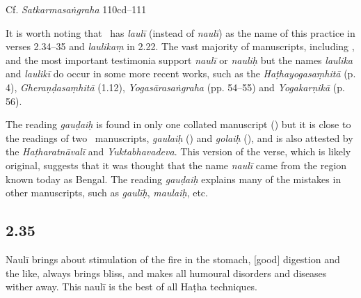\begin{ekdosis}
\begin{testimonia}[hp02_034]
Cf. \emph{Satkarmasaṅgraha} 110cd–111

\begin{versinnote}
\end{versinnote}

\end{testimonia}

\begin{philcomm}[hp02_034]
It is worth noting that \alphaOne\ has \emph{laulī} (instead of \emph{naulī}) as the name of this practice in verses 2.34–35 and \emph{laulikaṃ} in 2.22. The vast majority of manuscripts, including \alphaTwo, and the most important testimonia support \emph{naulī} or \emph{nauliḥ} but the names \emph{laulika} and \emph{laulikī} do occur in some more recent works, such as the \emph{Haṭhayogasaṃhitā} (p. 4), \emph{Gheraṇḍasaṃhitā} (1.12), \emph{Yogasārasaṅgraha} (pp. 54–55) and \emph{Yogakarṇikā} (p. 56). 


The reading \emph{gauḍaiḥ} is found in only one collated manuscript (\etaTwo) but it is close to the readings of two \textalpha\ manuscripts, \emph{gaulaiḥ} (\alphaOne) and \emph{golaiḥ} (\alphaThree), and is also attested by the \emph{Haṭharatnāvalī} and \emph{Yuktabhavadeva}. This version of the verse, which is likely original, suggests that it was thought that the name \emph{naulī} came from the region known today as Bengal. The reading \emph{gauḍaiḥ} explains many of the mistakes in other manuscripts, such as \emph{gaulīḥ}, \emph{maulaiḥ}, etc.
\end{philcomm}

\subsection*{2.35}
\begin{translation}[hp02_035]
Naulī brings about stimulation of the fire in the stomach, [good] digestion and the like, always brings bliss, and makes all humoural disorders and diseases wither away. This naulī is the best of all Haṭha techniques.
\end{translation}



\end{ekdosis}
